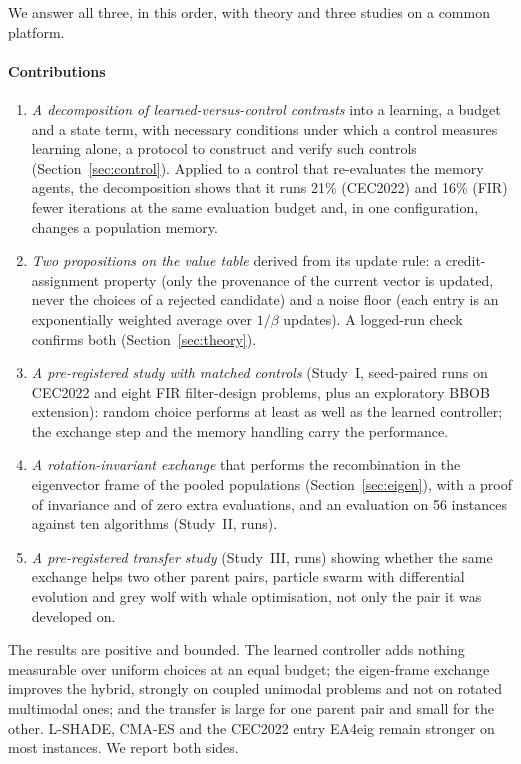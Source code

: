 We answer all three, in this order, with theory and three studies on a common platform.

\paragraph{Contributions}
\begin{enumerate}
\item \emph{A decomposition of learned-versus-control contrasts} into a learning, a budget and a state term, with
necessary conditions under which a control measures learning alone, a protocol to construct and verify such controls
(Section~\ref{sec:control}). Applied to a control that re-evaluates the memory agents, the decomposition shows that it runs
21\% (CEC2022) and 16\% (FIR) fewer iterations at the same evaluation budget and, in one configuration, changes a
population memory.
\item \emph{Two propositions on the value table} derived from its update rule: a credit-assignment property (only the
provenance of the current vector is updated, never the choices of a rejected candidate) and a noise floor (each entry is
an exponentially weighted average over $1/\beta$ updates). A logged-run check confirms both (Section~\ref{sec:theory}).
\item \emph{A pre-registered study with matched controls} (Study~I,  seed-paired runs on CEC2022 and eight
FIR filter-design problems, plus an exploratory BBOB extension): random choice performs at least as well as the learned
controller; the exchange step and the memory handling carry the performance.
\item \emph{A rotation-invariant exchange} that performs the recombination in the eigenvector frame of the pooled
populations (Section~\ref{sec:eigen}), with a proof of invariance and of zero extra evaluations, and an evaluation on 56
instances against ten algorithms (Study~II,  runs).
\item \emph{A pre-registered transfer study} (Study~III,  runs) showing whether the same exchange helps two other
parent pairs, particle swarm with differential evolution and grey wolf with whale optimisation, not only the pair it was
developed on.
\end{enumerate}

The results are positive and bounded. The learned controller adds nothing measurable over uniform choices at an equal
budget; the eigen-frame exchange improves the hybrid, strongly on coupled unimodal problems and not on rotated
multimodal ones; and the transfer is large for one parent pair and small for the other. L-SHADE, CMA-ES and the CEC2022
entry EA4eig remain stronger on most instances. We report both sides.

